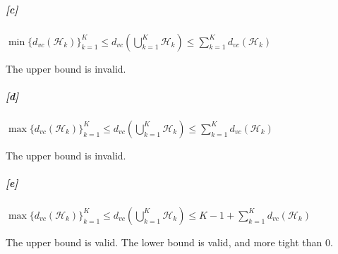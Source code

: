 \documentclass[10pt,letter]{article}
\begin{document}
	\subparagraph{[c]}
		$\min\{d_{vc}(\mathcal H_k)\}_{k=1}^K \leq d_{vc}(\bigcup_{k=1}^K \mathcal H_k) \leq \sum_{k=1}^K d_{vc}(\mathcal H_k)$

		The upper bound is invalid.
	
	\subparagraph{[d]}
		$\max\{d_{vc}(\mathcal H_k)\}_{k=1}^K \leq d_{vc}(\bigcup_{k=1}^K \mathcal H_k) \leq \sum_{k=1}^K d_{vc}(\mathcal H_k)$

		The upper bound is invalid.
	
	\subparagraph{[e]}
		$\max\{d_{vc}(\mathcal H_k)\}_{k=1}^K\leq d_{vc}(\bigcup_{k=1}^K \mathcal H_k) \leq K - 1 + \sum_{k=1}^K d_{vc}(\mathcal H_k)$

		The upper bound is valid. The lower bound is valid, and more tight than 0.
\end{document}
